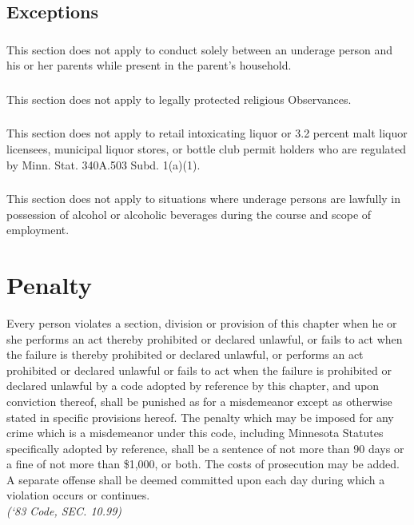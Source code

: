 \subsection{Exceptions}
\subsubsection{}
This section does not apply to conduct solely between an underage person and his or her parents while present in the parent’s household.
\subsubsection{}
This section does not apply to legally protected religious Observances.
\subsubsection{}
This section does not apply to retail intoxicating liquor or 3.2 percent malt liquor licensees, municipal liquor stores, or bottle club permit holders who are regulated by Minn. Stat. \textsection 340A.503 Subd. 1(a)(1).
\subsubsection{}
This section does not apply to situations where underage persons are lawfully in possession of alcohol or alcoholic beverages during the course and scope of employment.

\setcounter{section}{98}
\section{Penalty}
Every person violates a section, division or provision of this chapter when he or she performs an act thereby prohibited or declared unlawful, or fails to act when the failure is thereby prohibited or declared unlawful, or performs an act prohibited or declared unlawful or fails to act when the failure is prohibited or declared unlawful by a code adopted by reference by this chapter, and upon conviction thereof, shall be punished as for a misdemeanor except as otherwise stated in specific provisions hereof. The penalty which may be imposed for any crime which is a misdemeanor under this code, including Minnesota Statutes specifically adopted by reference, shall be a sentence of not more than 90 days or a fine of not more than \$1,000, or both. The costs of prosecution may be added. A separate offense shall be deemed committed upon each day during which a violation occurs or continues.\\
\emph{(‘83 Code, SEC. 10.99)}
